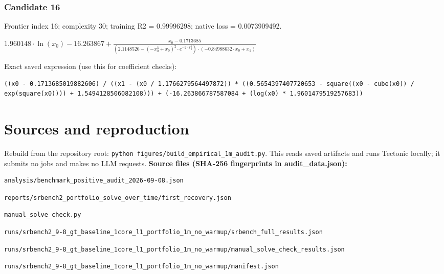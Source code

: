 \documentclass[10pt,letterpaper,landscape]{article}
\begin{document}
\subsubsection*{Candidate 16}
Frontier index 16; complexity 30; training R2 = 0.99996298; native loss = 0.0073909492.
\begin{center}\begin{adjustbox}{max width=\linewidth,max totalheight=1.0in}$\displaystyle 1.960148 \cdot \ln{\left(x_{0} \right)} - 16.263867 + \frac{x_{0} - 0.1713685}{\left(2.1148526 - \left(- x_{0}^{3} + x_{0}\right)^{2} \cdot e^{- 2 \cdot x_{0}^{2}}\right) \cdot \left(- 0.84988632 \cdot x_{0} + x_{1}\right)}$\end{adjustbox}\end{center}
{\scriptsize Exact saved expression (use this for coefficient checks):}
\begin{lstlisting}
((x0 - 0.1713685019882606) / ((x1 - (x0 / 1.1766279564497872)) * ((0.5654397407720653 - square((x0 - cube(x0)) / exp(square(x0)))) + 1.5494128506082108))) + (-16.263866787587084 + (log(x0) * 1.9601479519257683))
\end{lstlisting}
\clearpage\section*{Sources and reproduction}
Rebuild from the repository root: \texttt{python figures/build\_empirical\_1m\_audit.py}. This reads saved artifacts and runs Tectonic locally; it submits no jobs and makes no LLM requests.
\textbf{Source files (SHA-256 fingerprints in audit\_data.json):}
\begin{lstlisting}
analysis/benchmark_positive_audit_2026-09-08.json
\end{lstlisting}
\begin{lstlisting}
reports/srbench2_portfolio_solve_over_time/first_recovery.json
\end{lstlisting}
\begin{lstlisting}
manual_solve_check.py
\end{lstlisting}
\begin{lstlisting}
runs/srbench2_9-8_gt_baseline_1core_l1_portfolio_1m_no_warmup/srbench_full_results.json
\end{lstlisting}
\begin{lstlisting}
runs/srbench2_9-8_gt_baseline_1core_l1_portfolio_1m_no_warmup/manual_solve_check_results.json
\end{lstlisting}
\begin{lstlisting}
runs/srbench2_9-8_gt_baseline_1core_l1_portfolio_1m_no_warmup/manifest.json
\end{lstlisting}
\end{document}
